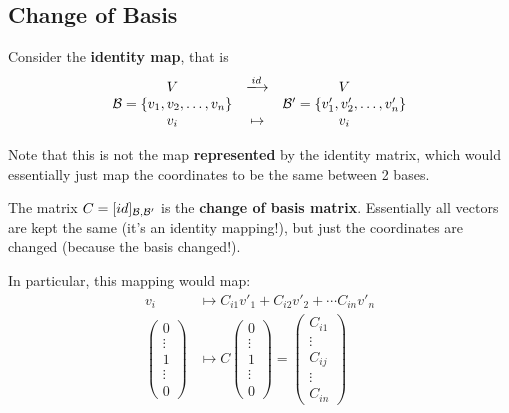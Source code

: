 
\subsection{Change of Basis}

Consider the \textbf{identity map}, that is
\[
    \begin{array}{ccc}
        V                               & \xlongrightarrow{id} & V                                   \\
        \cab = \{v_1, v_2, \dots, v_n\} &                      & \cab '= \{v'_1, v'_2, \dots, v'_n\} \\
        v_i                             & \mapsto              & v_i
    \end{array}
\]

Note that this is not the map \textbf{represented} by the identity matrix, which would essentially just map the coordinates to be the same between 2 bases.

The matrix \(C = [id]_{\mathcal{B}, \mathcal{B} '}\) is the \textbf{change of basis matrix}. Essentially all vectors are kept the same (it's an identity mapping!), but just the coordinates are changed (because the basis changed!).

In particular, this mapping would map:
\begin{align*}
    v_i             & \mapsto C_{i1}v'_1 + C_{i2} v'_2 + \cdots C_{in} v'_n \\
    \begin{pmatrix}
        0      \\
        \vdots \\
        1      \\
        \vdots \\
        0
    \end{pmatrix} & \mapsto C \begin{pmatrix}
                                  0      \\
                                  \vdots \\
                                  1      \\
                                  \vdots \\
                                  0
                              \end{pmatrix} = \begin{pmatrix}
                                                  C_{i1} \\
                                                  \vdots \\
                                                  C_{ij} \\
                                                  \vdots \\
                                                  C_{in}
                                              \end{pmatrix}
\end{align*}

